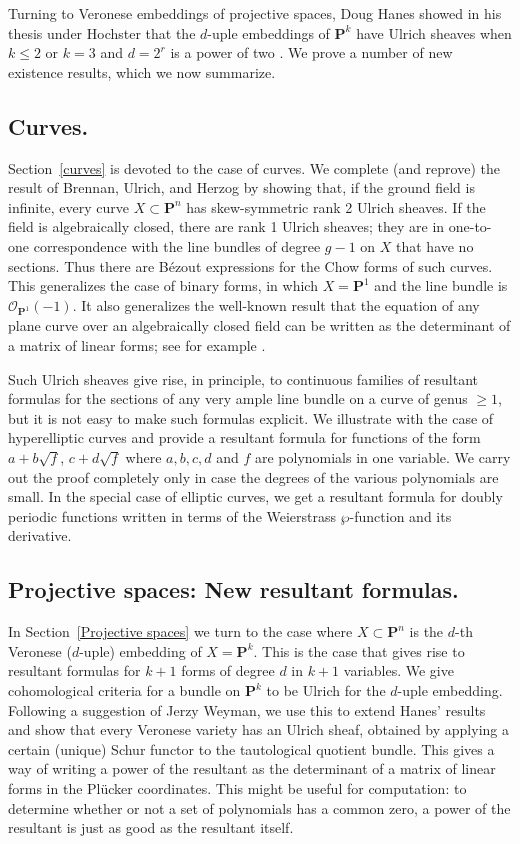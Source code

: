 \documentclass{jams-l}
\theoremstyle{definition}
\theoremstyle{remark}
\newcommand{\Ocal}{{\mathcal O}}
\newcommand{\PP}{{\mathbf P}}
\begin{document}
Turning to Veronese embeddings of projective spaces,
Doug Hanes showed
in his thesis under Hochster that
the $d$-uple embeddings of $\PP^k$ have Ulrich sheaves when
$k\leq 2$ or $k=3$ and $d=2^r$ is a power of two \cite{Hanes 2000}. We prove a
number of new existence results, which we now summarize.

\subsection*{Curves. }
Section~\ref{curves} is devoted to the case of curves. 
We complete (and reprove) 
the result of
Brennan, Ulrich, and Herzog by showing that,
if the ground field is infinite,
every curve $X\subset\PP^n$ 
has skew-symmetric rank 2 Ulrich sheaves.
If the field is algebraically closed, there are rank 1 Ulrich sheaves; they are in
one-to-one correspondence with the line bundles of degree $g-1$ on $X$ 
that have
no sections. Thus there are
B\'ezout expressions for the Chow forms of such curves.
This generalizes the case
of binary forms, in which
$X=\PP^1$ and the line bundle is $\Ocal_{\PP^1}(-1)$.
It also generalizes the
well-known result that the equation 
of any plane curve over an algebraically
closed field can be written as the determinant of 
a matrix of linear forms; see for example 
\cite{Vinnikov 1989,Beauville 2000}.

Such Ulrich sheaves give rise, in principle, to continuous 
families of resultant formulas for the
sections of any very ample line bundle on a curve of genus $\geq 1$, 
but it is not easy to make
such formulas explicit. We illustrate with the case of hyperelliptic
curves and provide a resultant formula for functions of the form
$a+b\sqrt{f}$, \; $c+d\sqrt{f}$ where $a,b,c,d$ and $f$ are polynomials
in one variable. We carry out the proof completely only in case the degrees
of the various polynomials are small. In the special case of elliptic curves, we get
a resultant formula for doubly periodic functions written in terms of the
Weierstrass $\wp$-function and its derivative.

\subsection*{Projective spaces: New resultant formulas. }
In Section~\ref{Projective spaces} we turn to the case where $X\subset \PP^n$ is
the $d$-th Veronese ($d$-uple) embedding of $X=\PP^k$. This is the 
case that gives rise to resultant formulas for $k+1$ forms of degree $d$
in $k+1$ variables. We give cohomological criteria for a bundle on
$\PP^k$ to be Ulrich for the $d$-uple embedding.
Following a suggestion of Jerzy Weyman, we use this to 
extend Hanes' results and show that
every Veronese variety has an Ulrich sheaf, obtained
by applying a certain (unique) Schur functor to the tautological
quotient bundle. This gives a way of writing a power
of the resultant as the determinant of a matrix of linear
forms in the Pl\"ucker coordinates. This 
might be useful for computation:
to determine whether or not a set
of polynomials has a common zero, a power of the resultant 
is just as good as the resultant itself.
\end{document}
